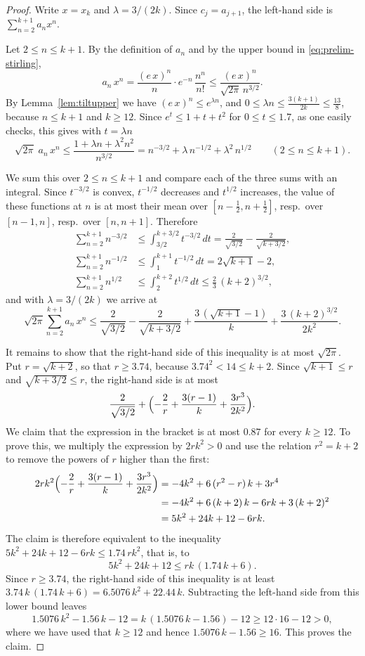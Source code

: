 \documentclass{amsart}
\theoremstyle{definition}
\theoremstyle{remark}
\numberwithin{equation}{section}
\begin{document}
\begin{proof}
Write $x=x_k$ and $\lambda=3/(2k)$. Since $c_j=a_{j+1}$, the left-hand side is $\sum_{n=2}^{k+1}a_nx^n$.

Let $2\le n\le k+1$. By the definition of $a_n$ and by the upper bound in \eqref{eq:prelim-stirling},
\[
a_n\,x^{n}=\frac{(e\,x)^n}{n}\cdot e^{-n}\,\frac{n^n}{n!}\le\frac{(e\,x)^n}{\sqrt{2\pi}\,n^{3/2}}.
\]
By Lemma~\ref{lem:tiltupper} we have $(e\,x)^n\le e^{\lambda n}$, and $0\le\lambda n\le\frac{3(k+1)}{2k}\le\frac{13}{8}$, because $n\le k+1$ and $k\ge 12$. Since $e^{t}\le 1+t+t^2$ for $0\le t\le 1.7$, as one easily checks, this gives with $t=\lambda n$
\[
\sqrt{2\pi}\;a_n\,x^{n}\le\frac{1+\lambda n+\lambda^2n^2}{n^{3/2}}=n^{-3/2}+\lambda\,n^{-1/2}+\lambda^2\,n^{1/2}\qquad(2\le n\le k+1).
\]

We sum this over $2\le n\le k+1$ and compare each of the three sums with an integral. Since $t^{-3/2}$ is convex, $t^{-1/2}$ decreases and $t^{1/2}$ increases, the value of these functions at $n$ is at most their mean over $[n-\frac12,n+\frac12]$, resp.\ over $[n-1,n]$, resp.\ over $[n,n+1]$. Therefore
\begin{align*}
\sum_{n=2}^{k+1}n^{-3/2}&\le\int_{3/2}^{k+3/2}t^{-3/2}\,dt=\frac{2}{\sqrt{3/2}}-\frac{2}{\sqrt{k+3/2}},\\
\sum_{n=2}^{k+1}n^{-1/2}&\le\int_{1}^{k+1}t^{-1/2}\,dt=2\sqrt{k+1}-2,\\
\sum_{n=2}^{k+1}n^{1/2}&\le\int_{2}^{k+2}t^{1/2}\,dt\le\frac23\,(k+2)^{3/2},
\end{align*}
and with $\lambda=3/(2k)$ we arrive at
\[
\sqrt{2\pi}\sum_{n=2}^{k+1}a_n\,x^{n}\le\frac{2}{\sqrt{3/2}}-\frac{2}{\sqrt{k+3/2}}+\frac{3\,(\sqrt{k+1}-1)}{k}+\frac{3\,(k+2)^{3/2}}{2k^2}.
\]

It remains to show that the right-hand side of this inequality is at most $\sqrt{2\pi}$. Put $r=\sqrt{k+2}$, so that $r\ge 3.74$, because $3.74^2<14\le k+2$. Since $\sqrt{k+1}\le r$ and $\sqrt{k+3/2}\le r$, the right-hand side is at most
\[
\frac{2}{\sqrt{3/2}}+\Bigl(-\frac{2}{r}+\frac{3(r-1)}{k}+\frac{3r^3}{2k^2}\Bigr).
\]
We claim that the expression in the bracket is at most $0.87$ for every $k\ge 12$. To prove this, we multiply the expression by $2rk^2>0$ and use the relation $r^2=k+2$ to remove the powers of $r$ higher than the first:
\begin{align*}
2rk^2\Bigl(-\frac{2}{r}+\frac{3(r-1)}{k}+\frac{3r^3}{2k^2}\Bigr)&=-4k^2+6\,(r^2-r)\,k+3r^4\\
&=-4k^2+6\,(k+2)\,k-6rk+3\,(k+2)^2\\
&=5k^2+24k+12-6rk.
\end{align*}
The claim is therefore equivalent to the inequality $5k^2+24k+12-6rk\le 1.74\,rk^2$, that is, to
\[
5k^2+24k+12\le rk\,(1.74\,k+6).
\]
Since $r\ge 3.74$, the right-hand side of this inequality is at least $3.74\,k\,(1.74\,k+6)=6.5076\,k^2+22.44\,k$. Subtracting the left-hand side from this lower bound leaves
\[
1.5076\,k^2-1.56\,k-12=k\,(1.5076\,k-1.56)-12\ge 12\cdot 16-12>0,
\]
where we have used that $k\ge 12$ and hence $1.5076\,k-1.56\ge 16$. This proves the claim.


\end{proof}
\end{document}
